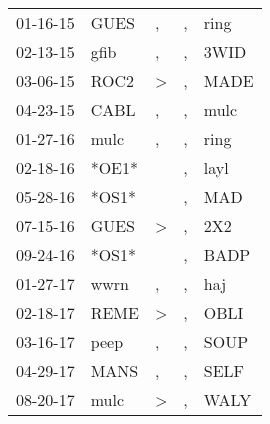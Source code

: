 \begin{supertabular}{p{0.07\textwidth}p{0.06\textwidth}p{0.02\textwidth}p{0.02\textwidth}p{0.06\textwidth}}
          01-16-15\textsuperscript{} &           GUES\textsuperscript{} &                , &                , &           ring\textsuperscript{} \\
          02-13-15\textsuperscript{} &           gfib\textsuperscript{} &                , &                , &           3WID\textsuperscript{} \\
          03-06-15\textsuperscript{} &           ROC2\textsuperscript{} &     \textgreater &                , &           MADE\textsuperscript{} \\
          04-23-15\textsuperscript{} &           CABL\textsuperscript{} &                , &                , &           mulc\textsuperscript{} \\
          01-27-16\textsuperscript{} &           mulc\textsuperscript{} &                , &                , &           ring\textsuperscript{} \\
          02-18-16\textsuperscript{} &                            *OE1* &                  &                , &           layl\textsuperscript{} \\
          05-28-16\textsuperscript{} &                            *OS1* &                  &                , &            MAD\textsuperscript{} \\
          07-15-16\textsuperscript{} &           GUES\textsuperscript{} &     \textgreater &                , &            2X2\textsuperscript{} \\
          09-24-16\textsuperscript{} &                            *OS1* &                  &                , &           BADP\textsuperscript{} \\
          01-27-17\textsuperscript{} &           wwrn\textsuperscript{} &                , &                , &            haj\textsuperscript{} \\
          02-18-17\textsuperscript{} &           REME\textsuperscript{} &     \textgreater &                , &           OBLI\textsuperscript{} \\
          03-16-17\textsuperscript{} &           peep\textsuperscript{} &                , &                , &           SOUP\textsuperscript{} \\
          04-29-17\textsuperscript{} &           MANS\textsuperscript{} &                , &                , &           SELF\textsuperscript{} \\
          08-20-17\textsuperscript{} &           mulc\textsuperscript{} &     \textgreater &                , &           WALY\textsuperscript{} \\

\end{supertabular}
